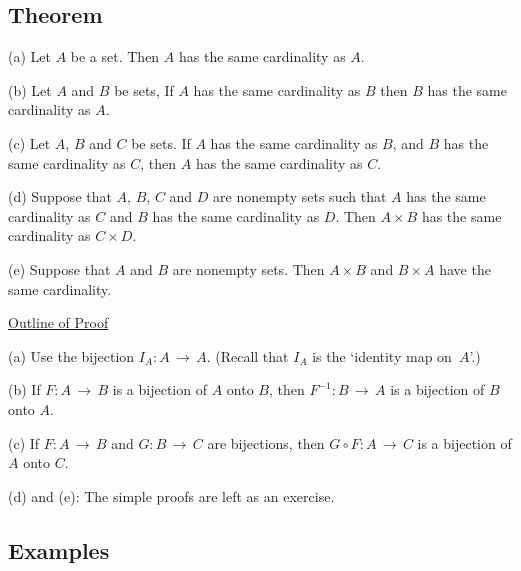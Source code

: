 \V
\V

        \subsection{\small{\bf Theorem}}
            \label{ThmA15.15}

\V

\hspace*{\parindent}(a) Let $A$ be a set. Then $A$ has the same cardinality as $A$.

\V

            (b) Let $A$ and $B$ be sets, If $A$ has the same cardinality as $B$ then $B$ has the same cardinality as $A$.


\V

            (c) Let $A$, $B$ and $C$  be sets.
    If $A$ has the same cardinality as $B$, and $B$ has the same cardinality as $C$, then $A$ has the same cardinality as $C$.

\V

            (d) Suppose that $A$, $B$, $C$ and $D$ are nonempty sets such that $A$ has the same cardinality as $C$ and $B$ has the same cardinality as $D$.
    Then $A{\times}B$ has the same cardinality as $C{\times}D$.
\V

            (e) Suppose that $A$ and $B$ are nonempty sets.
    Then $A{\times}B$ and $B{\times}A$ have the same cardinality.

\V

        \underline{Outline of Proof}

\V

        (a) Use the bijection $I_{A}:A \,{\rightarrow}\, A$. (Recall that $I_{A}$ is the `identity map on~$A$'.)

\V

        (b) If $F:A \,{\rightarrow}\, B$ is a bijection of $A$ onto $B$, then $F^{-1}:B \,{\rightarrow}\, A$ is a bijection of $B$ onto $A$.

\V

        (c) If $F:A \,{\rightarrow}\, B$ and $G:B \,{\rightarrow}\, C$ are bijections, 
    then $G{\circ}F:A \,{\rightarrow}\, C$ is a bijection of $A$ onto $C$.

\V

        (d) and (e): The simple proofs are left as an exercise.

\VV

            \subsection{\small{\bf Examples}}
            \label{ExampA15.20}

